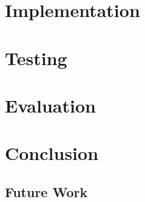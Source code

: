 \documentclass[11pt]{book}
\begin{document}
\chapter{Implementation}

\chapter{Testing}

\chapter{Evaluation}

\chapter{Conclusion}


\section{Future Work}
\end{document}

